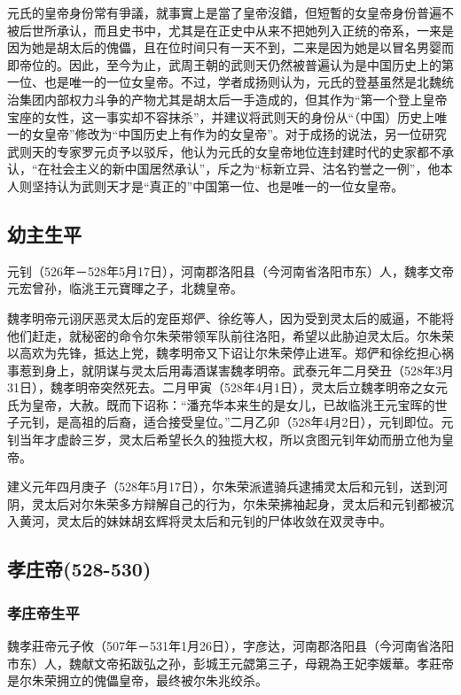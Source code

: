 元氏的皇帝身份常有爭議，就事實上是當了皇帝沒錯，但短暫的女皇帝身份普遍不被后世所承认，而且史书中，尤其是在正史中从来不把她列入正统的帝系，一来是因为她是胡太后的傀儡，且在位时间只有一天不到，二来是因为她是以冒名男婴而即帝位的。因此，至今为止，武周王朝的武则天仍然被普遍认为是中国历史上的第一位、也是唯一的一位女皇帝。不过，学者成扬则认为，元氏的登基虽然是北魏统治集团内部权力斗争的产物尤其是胡太后一手造成的，但其作为“第一个登上皇帝宝座的女性，这一事实却不容抹杀”，并建议将武则天的身份从“（中国）历史上唯一的女皇帝”修改为“中国历史上有作为的女皇帝”。对于成扬的说法，另一位研究武则天的专家罗元贞予以驳斥，他认为元氏的女皇帝地位连封建时代的史家都不承认，“在社会主义的新中国居然承认”，斥之为“标新立异、沽名钓誉之一例”，他本人则坚持认为武则天才是“真正的”中国第一位、也是唯一的一位女皇帝。


\subsection{幼主生平}

元钊（526年－528年5月17日），河南郡洛阳县（今河南省洛阳市东）人，魏孝文帝元宏曾孙，临洮王元寶暉之子，北魏皇帝。

魏孝明帝元诩厌恶灵太后的宠臣郑俨、徐纥等人，因为受到灵太后的威逼，不能将他们赶走，就秘密的命令尔朱荣带领军队前往洛阳，希望以此胁迫灵太后。尔朱荣以高欢为先锋，抵达上党，魏孝明帝又下诏让尔朱荣停止进军。郑俨和徐纥担心祸事惹到身上，就阴谋与灵太后用毒酒谋害魏孝明帝。武泰元年二月癸丑（528年3月31日），魏孝明帝突然死去。二月甲寅（528年4月1日），灵太后立魏孝明帝之女元氏为皇帝，大赦。既而下诏称：“潘充华本来生的是女儿，已故临洮王元宝晖的世子元钊，是高祖的后裔，适合接受皇位。”二月乙卯（528年4月2日），元钊即位。元钊当年才虚龄三岁，灵太后希望长久的独揽大权，所以贪图元钊年幼而册立他为皇帝。

建义元年四月庚子（528年5月17日），尔朱荣派遣骑兵逮捕灵太后和元钊，送到河阴，灵太后对尔朱荣多方辩解自己的行为，尔朱荣拂袖起身，灵太后和元钊都被沉入黄河，灵太后的妹妹胡玄辉将灵太后和元钊的尸体收敛在双灵寺中。

\subsection{孝庄帝\tiny(528-530)}

\subsubsection{孝庄帝生平}

魏孝莊帝元子攸（507年－531年1月26日），字彦达，河南郡洛阳县（今河南省洛阳市东）人，魏献文帝拓跋弘之孙，彭城王元勰第三子，母親為王妃李媛華。孝莊帝是尔朱荣拥立的傀儡皇帝，最终被尔朱兆绞杀。

